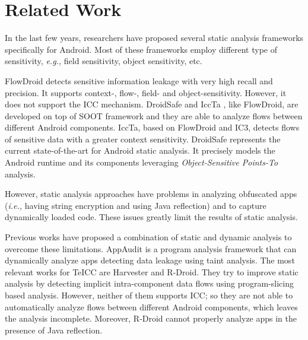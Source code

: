 \section{Related Work}
\label{sec:related}

In the last few years, researchers have proposed several static analysis frameworks specifically for Android. Most of these frameworks \cite{arzt2014flowdroid,lu2012chex,gibler2012androidleaks,li2015iccta,gordon2015information} employ different type of sensitivity, \textit{e.g.,} field sensitivity, object sensitivity, etc. 

FlowDroid \cite{arzt2014flowdroid} detects sensitive information leakage with very high recall and precision. It supports context-, flow-, field- and object-sensitivity. However, it does not support the ICC mechanism.
DroidSafe \cite{gordon2015information} and IccTa \cite{li2015iccta}, like FlowDroid, are developed on top of SOOT framework \cite{lam2011soot} and they are able to analyze flows between different Android components. IccTa, based on FlowDroid and IC3\cite{octeau2015composite},  detects flows of sensitive data with a greater context sensitivity. DroidSafe represents the current state-of-the-art for Android static analysis. It precisely models the Android runtime and its components leveraging \emph{Object-Sensitive Points-To} analysis.

However, static analysis approaches have problems in analyzing obfuscated apps (\textit{i.e.,} having string encryption and using Java reflection) and to capture dynamically loaded code. These issues greatly limit the results of static analysis.

Previous works have proposed a combination of static and dynamic analysis to overcome these limitations. AppAudit \cite{xia2015effective} is a program analysis framework that can dynamically analyze apps detecting data leakage using taint analysis. The most relevant works for TeICC are Harvester\cite{rasthofer2016harvesting} and R-Droid\cite{backes2016r}. They try to improve static analysis by detecting implicit intra-component data flows using program-slicing based analysis. However, neither of them supports ICC; so they are not able to automatically analyze flows between different Android components, which leaves the analysis incomplete. Moreover, R-Droid cannot properly analyze apps in the presence of Java reflection. 

